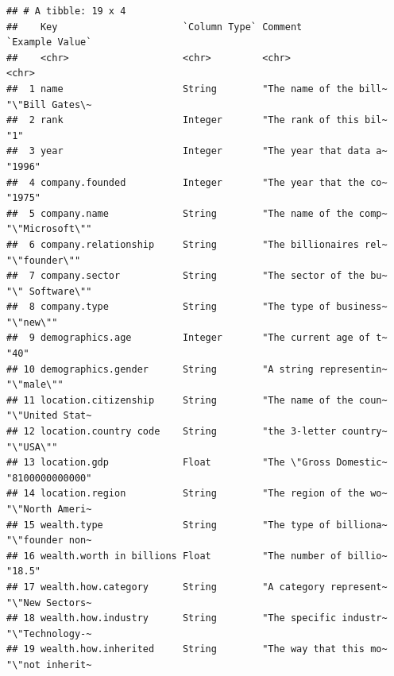 \documentclass[11pt,preprint]{elsarticle}
\numberwithin{equation}{section}
\numberwithin{figure}{section}
\numberwithin{table}{section}
\begin{document}
\begin{verbatim}
## # A tibble: 19 x 4
##    Key                      `Column Type` Comment                `Example Value`
##    <chr>                    <chr>         <chr>                  <chr>          
##  1 name                     String        "The name of the bill~ "\"Bill Gates\~
##  2 rank                     Integer       "The rank of this bil~ "1"            
##  3 year                     Integer       "The year that data a~ "1996"         
##  4 company.founded          Integer       "The year that the co~ "1975"         
##  5 company.name             String        "The name of the comp~ "\"Microsoft\""
##  6 company.relationship     String        "The billionaires rel~ "\"founder\""  
##  7 company.sector           String        "The sector of the bu~ "\" Software\""
##  8 company.type             String        "The type of business~ "\"new\""      
##  9 demographics.age         Integer       "The current age of t~ "40"           
## 10 demographics.gender      String        "A string representin~ "\"male\""     
## 11 location.citizenship     String        "The name of the coun~ "\"United Stat~
## 12 location.country code    String        "the 3-letter country~ "\"USA\""      
## 13 location.gdp             Float         "The \"Gross Domestic~ "8100000000000"
## 14 location.region          String        "The region of the wo~ "\"North Ameri~
## 15 wealth.type              String        "The type of billiona~ "\"founder non~
## 16 wealth.worth in billions Float         "The number of billio~ "18.5"         
## 17 wealth.how.category      String        "A category represent~ "\"New Sectors~
## 18 wealth.how.industry      String        "The specific industr~ "\"Technology-~
## 19 wealth.how.inherited     String        "The way that this mo~ "\"not inherit~
\end{verbatim}
\end{document}
